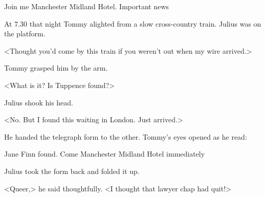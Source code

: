 \begin{telegram}[Julius.]
Join me Manchester Midland Hotel. Important news
\end{telegram}

At 7.30 that night Tommy alighted from a slow cross-country train. Julius was on the platform.

<Thought you'd come by this train if you weren't out when my wire arrived.>

Tommy grasped him by the arm.

<What is it? Is Tuppence found?>

Julius shook his head.

<No. But I found this waiting in London. Just arrived.>

He handed the telegraph form to the other. Tommy's eyes opened as he read:

\begin{telegram}
Jane Finn found. Come Manchester Midland Hotel immediately
\end{telegram}

Julius took the form back and folded it up.

<Queer,> he said thoughtfully. <I thought that lawyer chap had quit!> 